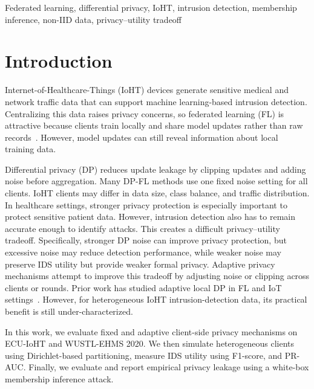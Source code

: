 \documentclass[conference]{IEEEtran}
\begin{document}
\begin{IEEEkeywords}
Federated learning, differential privacy, IoHT, intrusion detection, membership
inference, non-IID data, privacy--utility tradeoff
\end{IEEEkeywords}

\section{Introduction}

Internet-of-Healthcare-Things (IoHT) devices generate sensitive medical and
network traffic data that can support machine learning-based intrusion
detection. Centralizing this data raises privacy concerns, so federated learning
(FL) is attractive because clients train locally and share model updates rather
than raw records~\cite{mcmahan2017communication,prayitno2021healthcarefl}.
However, model updates can still reveal information about local training data.

Differential privacy (DP) reduces update leakage by clipping updates and adding
noise before aggregation. Many DP-FL methods use one fixed noise setting for all
clients. IoHT clients may differ in data size, class balance, and traffic
distribution. In healthcare settings, stronger privacy protection is especially
important to protect sensitive patient data. However, intrusion detection also
has to remain accurate enough to identify attacks. This creates a difficult
privacy–utility tradeoff. Specifically, stronger DP noise can improve privacy
protection, but excessive noise may reduce detection performance, while weaker
noise may preserve IDS utility but provide weaker formal privacy. Adaptive
privacy mechanisms attempt to improve this tradeoff by adjusting noise or
clipping across clients or rounds. Prior work has studied adaptive local DP in
FL and IoT settings~\cite{yue2025adapldpfl,he2024clustered,talaei2024adaptive}.
However, for heterogeneous IoHT intrusion-detection data, its practical benefit
is still under-characterized.

In this work, we evaluate fixed and adaptive client-side privacy mechanisms on
ECU-IoHT and WUSTL-EHMS 2020. We then simulate heterogeneous clients using
Dirichlet-based partitioning, measure IDS utility using F1-score, and PR-AUC.
Finally, we evaluate and report empirical privacy leakage using a white-box
membership inference attack.
\end{document}

